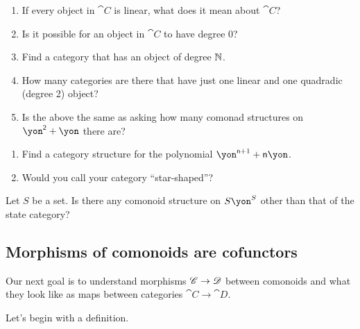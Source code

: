 \documentclass[Book-Poly]{subfiles}
\begin{document}
\begin{exercise}
\begin{enumerate}
	\item If every object in $\cat{C}$ is linear, what does it mean about $\cat{C}$?
	\item Is it possible for an object in $\cat{C}$ to have degree $0$?
	\item Find a category that has an object of degree $\mathbb{N}$.
	\item How many categories are there that have just one linear and one quadradic (degree 2) object?
	\item Is the above the same as asking how many comonad structures on $\yon^\2+\yon$ there are?
\end{enumerate}
\end{exercise}

\begin{exercise}\label{ex.star_shaped}
\begin{enumerate}
	\item Find a category structure for the polynomial $\yon^{\ord{n}+1}+\ord{n}\yon$.
	\item Would you call your category ``star-shaped''?
\qedhere
\end{enumerate}
\end{exercise}

\begin{exercise}
Let $S$ be a set. Is there any comonoid structure on $S\yon^S$ other than that of the state category?
\end{exercise}


\subsection{Morphisms of comonoids are cofunctors}

Our next goal is to understand morphisms $\mathscr{C}\to\mathscr{D}$ between comonoids and what they look like as maps between categories $\cat{C}\to\cat{D}$.


 
Let's begin with a definition.
\end{document}
